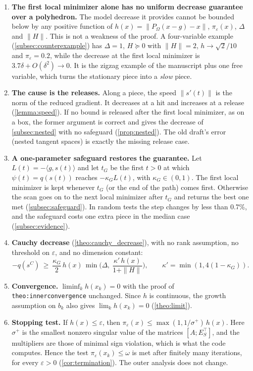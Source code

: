 \documentclass[11pt,a4paper]{article}
\numberwithin{equation}{section}
\theoremstyle{plain}
\theoremstyle{definition}
\theoremstyle{remark}
\newcommand{\inner}[2]{\langle #1,#2\rangle}
\newcommand{\kG}{\kappa_G}
\newcommand{\codeus}{\textunderscore\allowbreak}
\newcommand{\code}[1]{{\let\_\codeus\texttt{#1}}}
\begin{document}
\begin{enumerate}[1.]
\item \textbf{The first local minimizer alone has no uniform decrease guarantee over a
  polyhedron.} The model decrease it provides cannot be bounded below by any positive function
  of $h(x)=\|P_\Omega(x-g)-x\|$, $\pi_\varepsilon(x)$, $\Delta$ and $\|H\|$. This is not a
  weakness of the proof. A four-variable example (\cref{subsec:counterexample}) has
  $\Delta=1$, $H\succeq0$ with $\|H\|=2$, $h\to\sqrt2/10$ and $\pi_\varepsilon=0.2$, while the
  decrease at the first local minimizer is $3.7\delta+O(\delta^2)\to0$. It is the zigzag
  example of the manuscript plus one free variable, which turns the stationary piece into a
  \emph{slow} piece.
\item \textbf{The cause is the releases.} Along a piece, the speed $\|s'(t)\|$ is the norm of
  the reduced gradient. It decreases at a hit and increases at a release (\cref{lemma:speed}).
  If no bound is released after the first local minimizer, as on a box, the former argument is
  correct and gives the decrease of \cref{subsec:nested} with no safeguard
  (\cref{prop:nested}). The old draft's error (nested tangent spaces) is exactly the missing
  release case.
\item \textbf{A one-parameter safeguard restores the guarantee.} Let
  $L(t)=-\inner{g}{s(t)}$ and let $t_G$ be the first $t>0$ at which $\psi(t)=q(s(t))$ reaches
  $-\kG L(t)$, with $\kG\in(0,1)$. The first local minimizer is kept whenever $t_G$ (or the
  end of the path) comes first. Otherwise the scan goes on to the next local minimizer after
  $t_G$ and returns the best one met (\cref{subsec:safeguard}). In random tests the step
  changes by less than 0.7\%, and the safeguard costs one extra piece in the median case
  (\cref{subsec:evidence}).
\item \textbf{Cauchy decrease} (\cref{theo:cauchy_decrease}), with no rank assumption, no
  threshold on $\varepsilon$, and no dimension constant:
  \[
    -q(s^C)\ \ge\ \frac{\kG}{2}\,h(x)\,\min\Big(\Delta,\ \frac{\kappa'\,h(x)}{1+\|H\|}\Big),
    \qquad \kappa'=\min(1,4(1-\kG)).
  \]
\item \textbf{Convergence.} $\liminf_k h(x_k)=0$ with the proof of
  \code{theo:\allowbreak inner\_convergence} unchanged. Since $h$ is continuous, the growth assumption on
  $b_k$ also gives $\lim_k h(x_k)=0$ (\cref{theo:limit}).
\item \textbf{Stopping test.} If $h(x)\le\varepsilon$, then
  $\pi_\varepsilon(x)\le\max(1,1/\sigma^+)\,h(x)$. Here $\sigma^+$ is the smallest nonzero
  singular value of the matrices $[A;E_S^\top]$, and the multipliers are those of minimal sign
  violation, which is what the code computes. Hence the test $\pi_\varepsilon(x_k)\le\omega$ is
  met after finitely many iterations, for every $\varepsilon>0$ (\cref{cor:termination}). The
  outer analysis does not change.
\end{enumerate}
\end{document}
